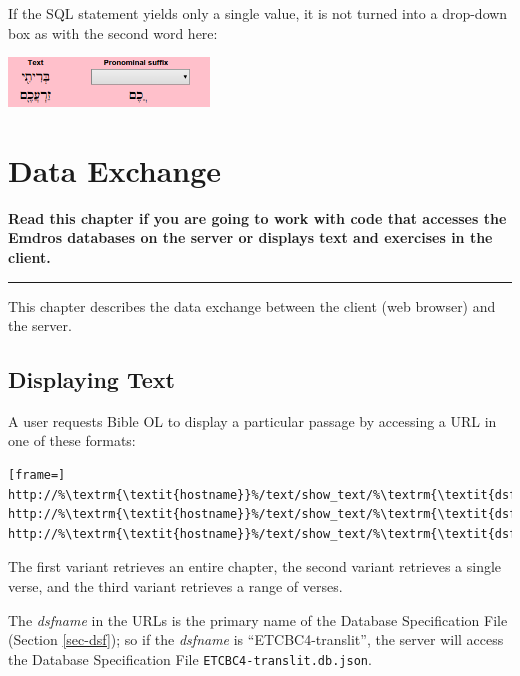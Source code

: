 \documentclass[11pt,oneside,a4paper]{memoir}
\begin{document}
If the SQL statement yields only a single value, it is not turned into a drop-down box as with the second
word here:

\begin{center}
  \includegraphics[width=0.4\textwidth]{pronsuf2.png}
\end{center}


\chapter{Data Exchange}\label{chap-data-exchange}

\textbf{Read this chapter if you are going to work with code that accesses the Emdros databases on
  the server or displays text and exercises in the client.}
\plainbreak{3}

This chapter describes the data exchange between the client (web browser) and the server.

\section{Displaying Text}\label{displaying-text}

A user requests Bible OL to display a particular passage by accessing a URL in one of these formats:

\begin{lstlisting}[frame=]
http://%\textrm{\textit{hostname}}%/text/show_text/%\textrm{\textit{dsfname}}%/%\textrm{\textit{book}}%/%\textrm{\textit{chapter}}%
http://%\textrm{\textit{hostname}}%/text/show_text/%\textrm{\textit{dsfname}}%/%\textrm{\textit{book}}%/%\textrm{\textit{chapter}}%/%\textrm{\textit{verse}}%
http://%\textrm{\textit{hostname}}%/text/show_text/%\textrm{\textit{dsfname}}%/%\textrm{\textit{book}}%/%\textrm{\textit{chapter}}%/%\textrm{\textit{firstverse}}%/%\textrm{\textit{lastverse}}%
\end{lstlisting}

The first variant retrieves an entire chapter, the second variant retrieves a single verse, and the
third variant retrieves a range of verses.

The \emph{dsfname} in the URLs is the primary name of the Database Specification File
(Section \ref{sec-dsf}); so if the \emph{dsfname} is ``ETCBC4-translit'', the server will access the
Database Specification File \texttt{ETCBC4-translit.db.json}.
\end{document}
